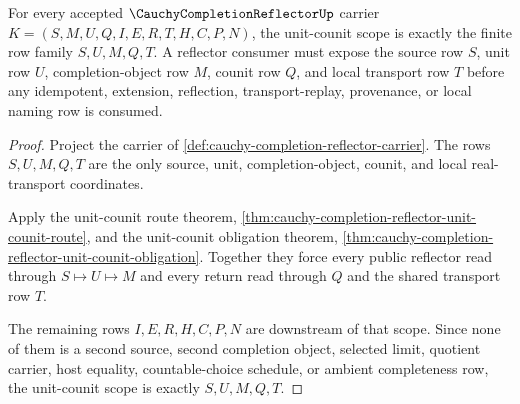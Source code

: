 \begin{theorem}
\label{thm:cauchy-completion-reflector-unit-counit-scope}
For every accepted $\CauchyCompletionReflectorUp$ carrier $K=(S,M,U,Q,I,E,R,T,H,C,P,N)$, the unit-counit scope is exactly the finite row family $S,U,M,Q,T$. A reflector consumer must expose the source row $S$, unit row $U$, completion-object row $M$, counit row $Q$, and local transport row $T$ before any idempotent, extension, reflection, transport-replay, provenance, or local naming row is consumed.
\end{theorem}
\begin{proof}
Project the carrier of \autoref{def:cauchy-completion-reflector-carrier}. The rows $S,U,M,Q,T$ are the only source, unit, completion-object, counit, and local real-transport coordinates.

Apply the unit-counit route theorem, \autoref{thm:cauchy-completion-reflector-unit-counit-route}, and the unit-counit obligation theorem, \autoref{thm:cauchy-completion-reflector-unit-counit-obligation}. Together they force every public reflector read through $S\mapsto U\mapsto M$ and every return read through $Q$ and the shared transport row $T$.

The remaining rows $I,E,R,H,C,P,N$ are downstream of that scope. Since none of them is a second source, second completion object, selected limit, quotient carrier, host equality, countable-choice schedule, or ambient completeness row, the unit-counit scope is exactly $S,U,M,Q,T$.
\end{proof}

